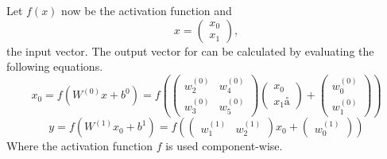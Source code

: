 Let \(f(x)\) now be the activation function and
\begin{equation}
    x =
    \begin{pmatrix}
        x_0 \\
        x_1
    \end{pmatrix},
\end{equation}
the input vector.
The output vector for  can be calculated by evaluating the following equations.
\begin{equation}
    x_0 =
    f(W^{(0)}x + b^{0}) =
    f(
    \begin{pmatrix}
        w_{2}^{(0)} & w_{4}^{(0)} \\
        w_{3}^{(0)} & w_{5}^{(0)}
    \end{pmatrix}
    \begin{pmatrix}
        x_0 \\
        x_1å
    \end{pmatrix}
    +
    \begin{pmatrix}
        w_{0}^{(0)} \\
        w_{1}^{(0)}
    \end{pmatrix}
    )
\end{equation}
\begin{equation}
    y =
    f(W^{(1)}x_0 + b^{1}) =
    f(
    \begin{pmatrix}
        w_{1}^{(1)} & w_{2}^{(1)}
    \end{pmatrix}
    x_0
    +
    \begin{pmatrix}
        w_{0}^{(1)}
    \end{pmatrix}
    )
\end{equation}
Where the activation function \(f\) is used component-wise.